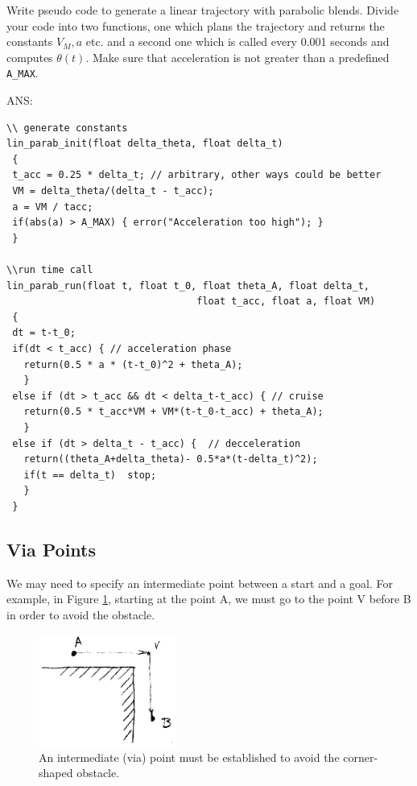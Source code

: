 \begin{ExampleSmall}
Write pseudo code to generate a linear trajectory with parabolic blends.   Divide your code into two functions, one which plans the trajectory and returns the constants $V_M, a$ etc. and a second one which is called every 0.001 seconds and computes $\theta(t)$.  Make sure that acceleration is not greater than a predefined {\tt A\_MAX}.

ANS:

\begin{verbatim}
\\ generate constants
lin_parab_init(float delta_theta, float delta_t)
 {
 t_acc = 0.25 * delta_t; // arbitrary, other ways could be better
 VM = delta_theta/(delta_t - t_acc);
 a = VM / tacc;
 if(abs(a) > A_MAX) { error("Acceleration too high"); }
 }

\\run time call
lin_parab_run(float t, float t_0, float theta_A, float delta_t,
                                 float t_acc, float a, float VM)
 {
 dt = t-t_0;
 if(dt < t_acc) { // acceleration phase
   return(0.5 * a * (t-t_0)^2 + theta_A);
   }
 else if (dt > t_acc && dt < delta_t-t_acc) { // cruise
   return(0.5 * t_acc*VM + VM*(t-t_0-t_acc) + theta_A);
   }
 else if (dt > delta_t - t_acc) {  // decceleration
   return((theta_A+delta_theta)- 0.5*a*(t-delta_t)^2);
   if(t == delta_t)  stop;
   }
 }

\end{verbatim}

\end{ExampleSmall}



\subsection{Via Points}

We may need to specify an intermediate point between a start and a goal.  For example, in Figure \ref{cornerviapoint}, starting at the point A, we must go to the point V before B in order to avoid the obstacle.



\begin{figure}\centering
\includegraphics[width= 4.5cm]{figs07/00513.eps}
\caption{An intermediate (via) point must be established to avoid the corner-shaped obstacle.}\label{cornerviapoint}
\end{figure}




